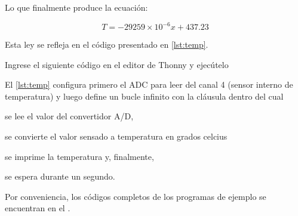 \noindent
Lo que finalmente produce la ecuación:

\begin{equation}%
	\label{eqn:adc-to-temp}
	T = -29259\times10^{-6}x + 437.23
\end{equation}

\noindent
Esta ley se refleja en el código presentado en \cref{lst:temp}.

\medskip{}

\noindent
Ingrese el siguiente código en el editor de Thonny y ejecútelo




El \cref{lst:temp} configura primero el ADC para leer del canal 4 (sensor interno de temperatura) y luego define un bucle infinito con la cláusula  dentro del cual
\begin{enumerate*}[label=\roman*\rpar]
	\item se lee el valor del convertidor A/D,
	\item se convierte el valor sensado a temperatura en grados celcius
	\item se imprime la temperatura
	y, finalmente,
	\item se espera durante un segundo.
\end{enumerate*}

Por conveniencia, los códigos completos de los programas de ejemplo se encuentran en el .
